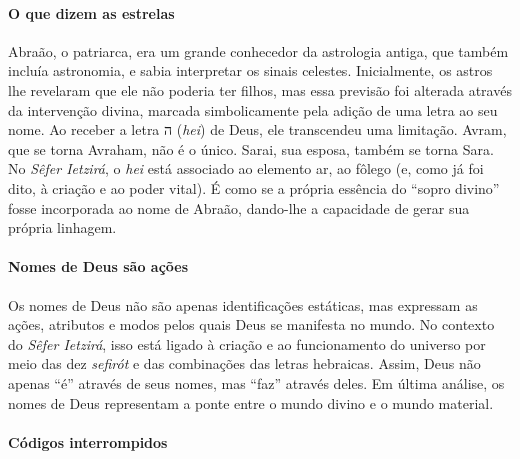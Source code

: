 \paragraph{O que dizem as estrelas} Abraão, o patriarca, era um grande conhecedor da astrologia antiga, que também incluía astronomia, e sabia interpretar os sinais celestes. Inicialmente, os astros lhe revelaram que ele não poderia ter filhos, mas essa previsão foi alterada através da intervenção divina, marcada simbolicamente pela adição de uma letra ao seu nome. Ao receber a letra {\frank ה} (\textit{hei}) de Deus, ele transcendeu uma limitação. Avram, que se torna Avraham, não é o único. Sarai, sua esposa, também se torna Sara. No \textit{Sêfer Ietzirá}, o \textit{hei} está associado ao elemento ar, ao fôlego (e, como já foi dito, à criação e ao poder vital). É como se a própria essência do ``sopro divino'' fosse incorporada ao nome de Abraão, dando-lhe a capacidade de gerar sua própria linhagem.

\paragraph{Nomes de Deus são ações} Os nomes de Deus não são apenas identificações estáticas, mas expressam as ações, atributos e modos pelos quais Deus se manifesta no mundo. No contexto do \textit{Sêfer Ietzirá}, isso está ligado à criação e ao funcionamento do universo por meio das dez \textit{sefirót} e das combinações das letras hebraicas. Assim, Deus não apenas ``é'' através de seus nomes, mas ``faz'' através deles. Em última análise, os nomes de Deus representam a ponte entre o mundo divino e o mundo material.  

\paragraph{Códigos interrompidos} 